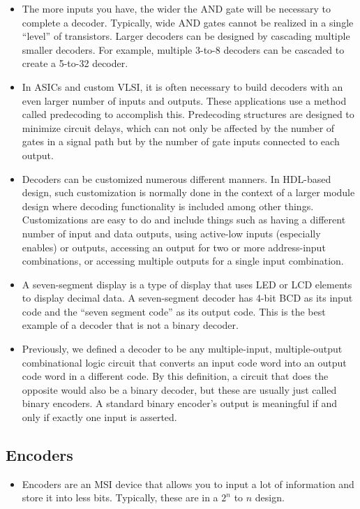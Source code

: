 \documentclass[10pt,a4paper]{article}
\begin{document}
\begin{itemize}
\item The more inputs you have, the wider the AND gate will be necessary to complete a decoder. Typically, wide AND gates cannot be realized in a single ``level'' of transistors. Larger decoders can be designed by cascading multiple smaller decoders. For example, multiple 3-to-8 decoders can be cascaded to create a 5-to-32 decoder.
\item In ASICs and custom VLSI, it is often necessary to build decoders with an even larger number of inputs and outputs. These applications use a method called predecoding to accomplish this. Predecoding structures are designed to minimize circuit delays, which can not only be affected by the number of gates in a signal path but by the number of gate inputs connected to each output.
\item Decoders can be customized numerous different manners. In HDL-based design, such customization is normally done in the context of a larger module design where decoding functionality is included among other things. Customizations are easy to do and include things such as having a different number of input and data outputs, using active-low inputs (especially enables) or outputs, accessing an output for two or more address-input combinations, or accessing multiple outputs for a single input combination.
\item A seven-segment display is a type of display that uses LED or LCD elements to display decimal data. A seven-segment decoder has 4-bit BCD as its input code and the ``seven segment code'' as its output code. This is the best example of a decoder that is not a binary decoder. 
\item Previously, we defined a decoder to be any multiple-input, multiple-output combinational logic circuit that converts an input code word into an output code word in a different code. By this definition, a circuit that does the opposite would also be a binary decoder, but these are usually just called binary encoders. A standard binary encoder's output is meaningful if and only if exactly one input is asserted.  
\end{itemize}
\subsection{Encoders}
\begin{itemize}
\item Encoders are an MSI device that allows you to input a lot of information and store it into less bits. Typically, these are in a $2^n$ to $n$ design. 
\end{itemize}
\end{document}
